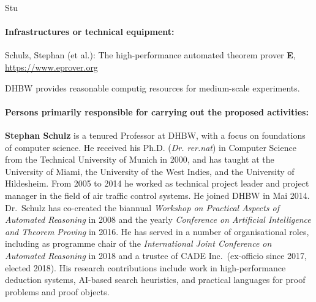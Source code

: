 \begin{sitedescription}{Stu}
\paragraph*{Infrastructures or technical equipment:}

\begin{compactitem}
\item Schulz, Stephan (et al.): The high-performance automated theorem
  prover \textbf{E}, \url{https://www.eprover.org}
\item DHBW provides reasonable computig resources for medium-scale
  experiments.
\end{compactitem}




\paragraph*{Persons primarily responsible for carrying out the proposed activities:}

\begin{compactitem}
\item \textbf{Stephan Schulz} is a tenured Professor at DHBW, with a
  focus on foundations of computer science. He received his
  Ph.D. (\emph{Dr. rer.nat}) in Computer Science from the Technical
  University of Munich in 2000, and has taught at the University of
  Miami, the University of the West Indies, and the University of
  Hildesheim. From 2005 to 2014 he worked as technical project leader
  and project manager in the field of air traffic control systems. He
  joined DHBW in Mai 2014. Dr.\ Schulz has co-created the biannual
  \emph{Workshop on Practical Aspects of Automated Reasoning} in 2008
  and the yearly \emph{Conference on Artificial Intelligence and
    Theorem Proving} in 2016. He has served in a number of
  organisational roles, including as programme chair of the
  \emph{International Joint Conference on Automated Reasoning} in 2018
  and a trustee of CADE Inc.\ (ex-officio since 2017, elected
  2018). His research contributions include work in high-performance
  deduction systems, AI-based search heuristics, and practical
  languages for proof problems and proof objects.
\end{compactitem}

\end{sitedescription}
